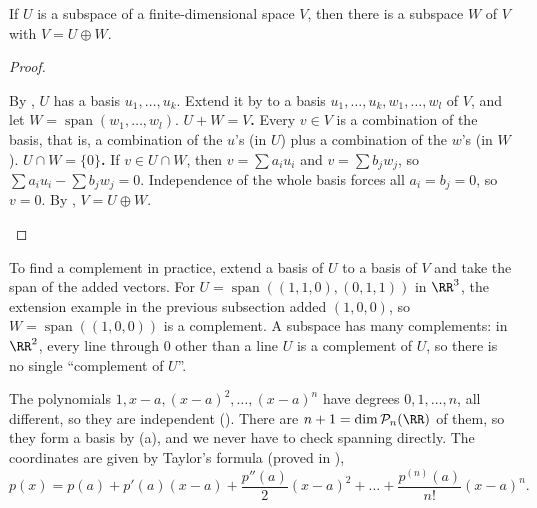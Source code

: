 \documentclass[10pt]{scrartcl}
\DeclareMathOperator{\spn}{span}
\newcommand{\PP}{\mathcal P}
\begin{document}
\begin{proposition*}
  If $U$ is a subspace of a finite-dimensional space $V$, then there is a subspace $W$ of $V$ with $V=U\oplus W$.
\end{proposition*}
\begin{proof}
  \begin{steps}
    \ii By , $U$ has a basis $u_1,\dots,u_k$. Extend it by  to a basis $u_1,\dots,u_k,w_1,\dots,w_l$ of $V$, and let $W=\spn(w_1,\dots,w_l)$.
    \ii \textbf{$U+W=V$.} Every $v\in V$ is a combination of the basis, that is, a combination of the $u$'s (in $U$) plus a combination of the $w$'s (in $W$).
    \ii \textbf{$U\cap W=\{0\}$.} If $v\in U\cap W$, then $v=\sum a_iu_i$ and $v=\sum b_jw_j$, so $\sum a_iu_i-\sum b_jw_j=0$. Independence of the whole basis forces all $a_i=b_j=0$, so $v=0$. By , $V=U\oplus W$.
  \end{steps}
\end{proof}

To find a complement in practice, extend a basis of $U$ to a basis of $V$ and take the span of the added vectors. For $U=\spn((1,1,0),(0,1,1))$ in $\RR^3$, the extension example in the previous subsection added $(1,0,0)$, so $W=\spn((1,0,0))$ is a complement. A subspace has many complements: in $\RR^2$, every line through $0$ other than a line $U$ is a complement of $U$, so there is no single ``complement of $U$''.

\begin{example*}[The basis $1,x-a,\dots,(x-a)^n$ of $\PP_n(\RR)$ (Notes Ex.~18)]
  The polynomials $1,x-a,(x-a)^2,\dots,(x-a)^n$ have degrees $0,1,\dots,n$, all different, so they are independent (). There are $n+1=\dim\PP_n(\RR)$ of them, so they form a basis by (a), and we never have to check spanning directly. The coordinates are given by Taylor's formula (proved in ),
  \[
    p(x)=p(a)+p'(a)(x-a)+\frac{p''(a)}{2}(x-a)^2+\dots+\frac{p^{(n)}(a)}{n!}(x-a)^n .
  \]
\end{example*}
\end{document}
